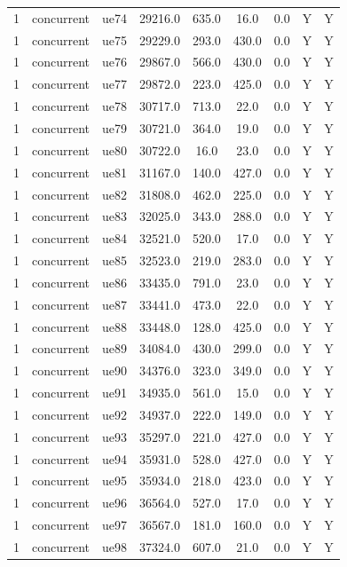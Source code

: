 \begin{table}[ht]
\begin{tabular}{|c|c|c|c|c|c|c|c|c|}
1 & concurrent & ue74 & 29216.0 & 635.0 & 16.0 & 0.0 & Y & Y \\
1 & concurrent & ue75 & 29229.0 & 293.0 & 430.0 & 0.0 & Y & Y \\
1 & concurrent & ue76 & 29867.0 & 566.0 & 430.0 & 0.0 & Y & Y \\
1 & concurrent & ue77 & 29872.0 & 223.0 & 425.0 & 0.0 & Y & Y \\
1 & concurrent & ue78 & 30717.0 & 713.0 & 22.0 & 0.0 & Y & Y \\
1 & concurrent & ue79 & 30721.0 & 364.0 & 19.0 & 0.0 & Y & Y \\
1 & concurrent & ue80 & 30722.0 & 16.0 & 23.0 & 0.0 & Y & Y \\
1 & concurrent & ue81 & 31167.0 & 140.0 & 427.0 & 0.0 & Y & Y \\
1 & concurrent & ue82 & 31808.0 & 462.0 & 225.0 & 0.0 & Y & Y \\
1 & concurrent & ue83 & 32025.0 & 343.0 & 288.0 & 0.0 & Y & Y \\
1 & concurrent & ue84 & 32521.0 & 520.0 & 17.0 & 0.0 & Y & Y \\
1 & concurrent & ue85 & 32523.0 & 219.0 & 283.0 & 0.0 & Y & Y \\
1 & concurrent & ue86 & 33435.0 & 791.0 & 23.0 & 0.0 & Y & Y \\
1 & concurrent & ue87 & 33441.0 & 473.0 & 22.0 & 0.0 & Y & Y \\
1 & concurrent & ue88 & 33448.0 & 128.0 & 425.0 & 0.0 & Y & Y \\
1 & concurrent & ue89 & 34084.0 & 430.0 & 299.0 & 0.0 & Y & Y \\
1 & concurrent & ue90 & 34376.0 & 323.0 & 349.0 & 0.0 & Y & Y \\
1 & concurrent & ue91 & 34935.0 & 561.0 & 15.0 & 0.0 & Y & Y \\
1 & concurrent & ue92 & 34937.0 & 222.0 & 149.0 & 0.0 & Y & Y \\
1 & concurrent & ue93 & 35297.0 & 221.0 & 427.0 & 0.0 & Y & Y \\
1 & concurrent & ue94 & 35931.0 & 528.0 & 427.0 & 0.0 & Y & Y \\
1 & concurrent & ue95 & 35934.0 & 218.0 & 423.0 & 0.0 & Y & Y \\
1 & concurrent & ue96 & 36564.0 & 527.0 & 17.0 & 0.0 & Y & Y \\
1 & concurrent & ue97 & 36567.0 & 181.0 & 160.0 & 0.0 & Y & Y \\
1 & concurrent & ue98 & 37324.0 & 607.0 & 21.0 & 0.0 & Y & Y \\

\end{tabular}
\end{table}
